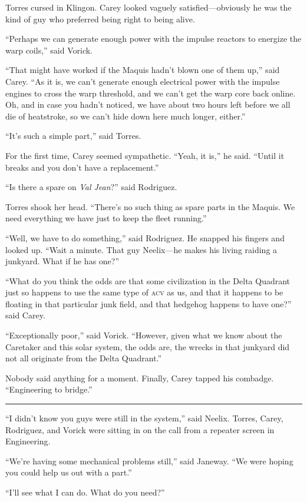 \documentclass[twoside,letterpaper,12pt]{memoir}
\begin{document}
Torres cursed in Klingon. Carey looked vaguely satisfied---obviously he was the kind of guy who preferred being right to being alive.

``Perhaps we can generate enough power with the impulse reactors to energize the warp coils,'' said Vorick.

``That might have worked if the Maquis hadn't blown one of them up,'' said Carey. ``As it is, we can't generate enough electrical power with the impulse engines to cross the warp threshold, and we can't get the warp core back online. Oh, and in case you hadn't noticed, we have about two hours left before we all die of heatstroke, so we can't hide down here much longer, either.''

``It's such a simple part,'' said Torres.

For the first time, Carey seemed sympathetic. ``Yeah, it is,'' he said. ``Until it breaks and you don't have a replacement.''

``Is there a spare on \textit{Val Jean}?'' said Rodriguez.

Torres shook her head. ``There’s no such thing as spare parts in the Maquis. We need everything we have just to keep the fleet running.''

``Well, we have to do something,'' said Rodriguez. He snapped his fingers and looked up. ``Wait a minute. That guy Neelix---he makes his living raiding a junkyard. What if he has one?''

``What do you think the odds are that some civilization in the Delta Quadrant just so happens to use the same type of \textsc{acv} as us, and that it happens to be floating in that particular junk field, and that hedgehog happens to have one?'' said Carey.

``Exceptionally poor,'' said Vorick. ``However, given what we know about the Caretaker and this solar system, the odds are, the wrecks in that junkyard did not all originate from the Delta Quadrant.''

Nobody said anything for a moment. Finally, Carey tapped his combadge. ``Engineering to bridge.''

\fancybreak{\rule{3cm}{0.4 pt}}
``I didn't know you guys were still in the system,'' said Neelix. Torres, Carey, Rodriguez, and Vorick were sitting in on the call from a repeater screen in Engineering.

``We're having some mechanical problems still,'' said Janeway. ``We were hoping you could help us out with a part.''

``I'll see what I can do. What do you need?''
\end{document}
